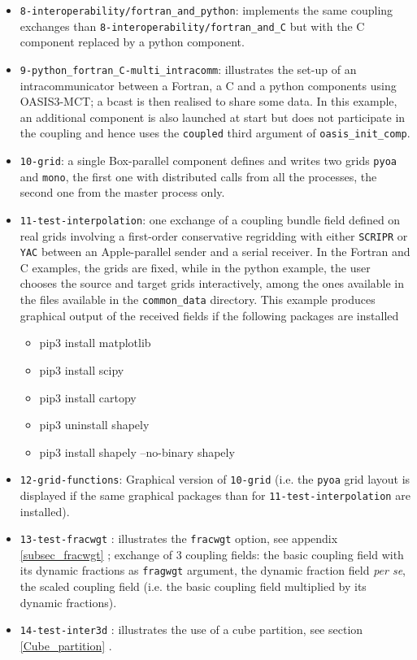 \begin{itemize}
\item{{\tt 8-interoperability/fortran\_and\_python}}: implements the same coupling exchanges than {{\tt 8-interoperability/fortran\_and\_C}} but with the C component replaced by a python component.
\item{{\tt 9-python\_fortran\_C-multi\_intracomm}}: illustrates the set-up of an intracommunicator between a Fortran, a C and a python components using OASIS3-MCT; a bcast is then realised to share some data. In this example, an additional component is also launched at start but does not participate in the coupling and hence uses the {\tt coupled} third argument of {\tt oasis\_init\_comp}.
\item{{\tt 10-grid}}: a single Box-parallel component defines and writes two grids {\tt pyoa} and {\tt mono}, the first one with distributed calls from all the processes, the second one from the master process only.
\item{{\tt 11-test-interpolation}}: one exchange of a coupling bundle field defined on real grids involving a first-order conservative regridding with either {\tt SCRIPR} or {\tt YAC} between an Apple-parallel sender and a serial receiver.  In the Fortran and C examples, the grids are fixed, while in the python example, the user chooses the source and target grids interactively, among the ones available in the files available in the {\tt common\_data} directory. This example produces graphical output of the received fields if the following packages are installed
\begin{itemize}
\item pip3 install matplotlib
\item pip3 install scipy
\item pip3 install cartopy
\item pip3 uninstall shapely
\item pip3 install shapely --no-binary shapely
\end{itemize}
\item{\tt 12-grid-functions}: Graphical version of {{\tt 10-grid}} (i.e. the {\tt pyoa} grid layout is displayed if the same graphical packages than for {{\tt 11-test-interpolation}} are installed).
\item {\tt 13-test-fracwgt} : illustrates the {\tt fracwgt} option, see appendix \ref{subsec_fracwgt} ; exchange of 3 coupling fields: the basic coupling field with its dynamic fractions as {\tt fragwgt} argument, the dynamic fraction field {\it per se}, the scaled coupling field (i.e. the basic coupling field multiplied by its dynamic fractions).
\item {\tt 14-test-inter3d} : illustrates the use of a cube partition, see section \ref{Cube_partition} .
\end{itemize}

